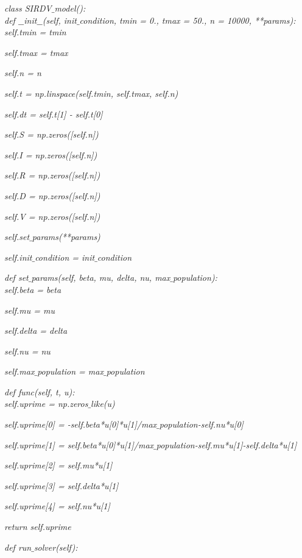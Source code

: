 \documentclass[14pt]{amsart}
\begin{document}
\noindent \textit{class SIRDV$\_$model():}\\

\noindent \textit{def $\_\_$init$\_\_$(self, init$\_$condition, tmin = 0., tmax = 50., n = 10000, **params):}\\

\textit{self.tmin = tmin}

\textit{self.tmax = tmax}

\textit{self.n = n}

\textit{self.t = np.linspace(self.tmin, self.tmax, self.n)}

\textit{self.dt = self.t[1] - self.t[0]}

\textit{self.S = np.zeros([self.n])}

\textit{self.I = np.zeros([self.n])}

\textit{self.R = np.zeros([self.n])}

\textit{self.D = np.zeros([self.n])}

\textit{self.V = np.zeros([self.n])}

\textit{self.set$\_$params(**params)}

\textit{self.init$\_$condition = init$\_$condition }

\noindent \textit{def set$\_$params(self, beta, mu, delta, nu, max$\_$population):}\\

 
\textit{self.beta = beta}

\textit{self.mu =  mu}

\textit{self.delta = delta}

\textit{self.nu = nu}

\textit{self.max$\_$population = max$\_$population}

\noindent \textit{def func(self, t, u):}\\

 
\textit{self.uprime = np.zeros$\_$like(u)}

\textit{self.uprime[0] = -self.beta*u[0]*u[1]/max$\_$population-self.nu*u[0]}

\textit{self.uprime[1] = self.beta*u[0]*u[1]/max$\_$population-self.mu*u[1]-self.delta*u[1]}

\textit{self.uprime[2] = self.mu*u[1]}

\textit{self.uprime[3] = self.delta*u[1]}

\textit{self.uprime[4] = self.nu*u[1]}

\textit{return self.uprime}

\noindent \textit{def run$\_$solver(self):}\\
\end{document}
